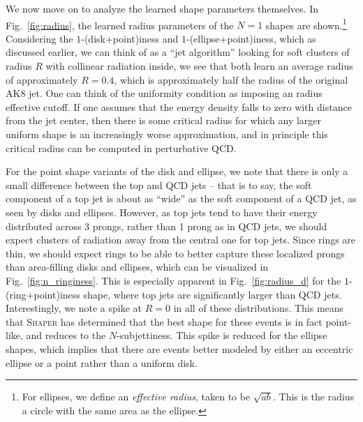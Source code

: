 \documentclass[letterpaper,11pt]{article}
\DeclareRobustCommand{\Fig}[1]{Fig.~\ref{fig:#1}}
\newcommand{\Shaper}{\textsc{Shaper}\xspace}
\begin{document}
We now move on to analyze the learned shape parameters themselves. In \Fig{radius}, the learned radius parameters of the $N = 1$ shapes are shown.\footnote{For ellipses, we define an \emph{effective radius}, taken to be $\sqrt{ab}$. This is the radius a circle with the same area as the ellipse.} Considering the $1$-(disk$+$point)iness and $1$-(ellipse$+$point)iness, which as discussed earlier, we can think of as a ``jet algorithm'' looking for soft clusters of radius $R$ with collinear radiation inside, we see that both learn an average radius of approximately $R = 0.4$, which is approximately half the radius of the original AK8 jet. One can think of the uniformity condition as imposing an radius effective cutoff. If one assumes that the energy density falls to zero with distance from the jet center, then there is some critical radius for which any larger uniform shape is an increasingly worse approximation, and in principle this critical radius can be computed in perturbative QCD. 

For the point shape variants of the disk and ellipse, we note that there is only a small difference between the top and QCD jets -- that is to say, the soft component of a top jet is about as ``wide'' as the soft component of a QCD jet, as seen by disks and ellipses. However, as top jets tend to have their energy distributed across 3 prongs, rather than 1 prong as in QCD jets, we should expect clusters of radiation away from the central one for top jets. Since rings are thin, we should expect rings to be able to better capture these localized prongs than area-filling disks and ellipses, which can be visualized in \Fig{n_ringiness}. This is especially apparent in \Fig{radius_d} for the $1$-(ring$+$point)iness shape, where top jets are significantly larger than QCD jets. Interestingly, we note a spike at $R = 0$ in all of these distributions. This means that \Shaper has determined that the best shape for these events is in fact point-like, and reduces to the $N$-subjettiness. This spike is reduced for the ellipse shapes, which implies that there are events better modeled by either an eccentric ellipse or a point rather than a uniform disk. 
\end{document}
